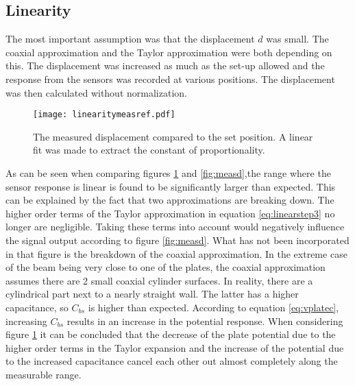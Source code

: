 \subsection{Linearity}
The most important assumption was that the displacement $d$ was small. The coaxial approximation and the Taylor approximation were both depending on this. The displacement was increased as much as the set-up allowed and the response from the sensors was recorded at various positions. The displacement was then calculated without normalization. 
\begin{figure}[h]
\centering
\texttt{[image: linearitymeasref.pdf]}
\caption{The measured displacement compared to the set position. A linear fit was made to extract the constant of proportionality.}
\label{fig:linearitymeas}
\end{figure}

As can be seen when comparing figures \ref{fig:linearitymeas} and \ref{fig:measd},the range where the sensor response is linear is found to be significantly larger than expected. This can be explained by the fact that two approximations are breaking down. The higher order terms of the Taylor approximation in equation \ref{eq:linearstep3} no longer are negligible. Taking these terms into account would negatively influence the signal output according to figure \ref{fig:measd}. What has not been incorporated in that figure is the breakdown of the coaxial approximation. In the extreme case of the beam being very close to one of the plates, the coaxial approximation assumes there are 2 small coaxial cylinder surfaces. In reality, there are a cylindrical part next to a nearly straight wall. The latter has a higher capacitance, so $C_{bs}$ is higher than expected. According to equation \ref{eq:vplatec}, increasing $C_{bs}$ results in an increase in the potential response. When considering figure \ref{fig:linearitymeas} it can be concluded that the decrease of the plate potential due to the higher order terms in the Taylor expansion and the increase of the potential due to the increased capacitance cancel each other out almost completely along the measurable range.

